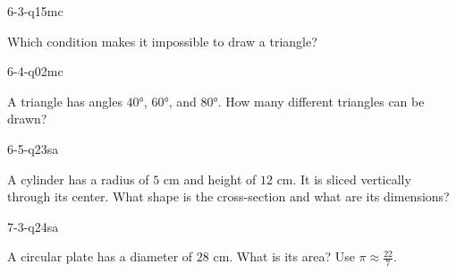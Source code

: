 \begin{practiceQuestion}{6-3-q15}{mc}
\begin{questionText}
Which condition makes it impossible to draw a triangle?
\end{questionText}
\end{practiceQuestion}

\begin{practiceQuestion}{6-4-q02}{mc}
\begin{questionText}
A triangle has angles $40°$, $60°$, and $80°$. How many different triangles can be drawn?
\end{questionText}
\end{practiceQuestion}

\begin{practiceQuestion}{6-5-q23}{sa}
\begin{questionText}
A cylinder has a radius of $5$ cm and height of $12$ cm. It is sliced vertically through its center. What shape is the cross-section and what are its dimensions?
\end{questionText}
\end{practiceQuestion}

\begin{practiceQuestion}{7-3-q24}{sa}
\begin{questionText}
A circular plate has a diameter of $28$ cm. What is its area? Use $\pi \approx \frac{22}{7}$.
\end{questionText}
\end{practiceQuestion}

